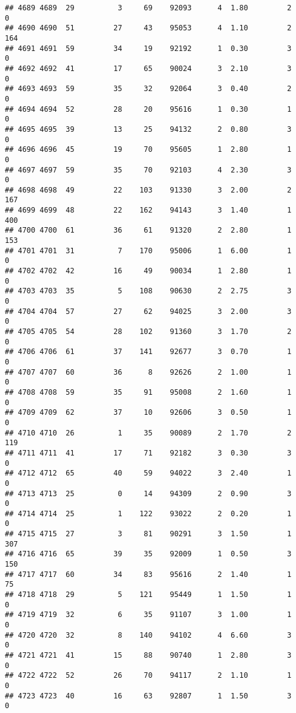 \documentclass[
]{article}
\begin{document}
\begin{verbatim}
## 4689 4689  29          3     69    92093      4  1.80         2        0
## 4690 4690  51         27     43    95053      4  1.10         2      164
## 4691 4691  59         34     19    92192      1  0.30         3        0
## 4692 4692  41         17     65    90024      3  2.10         3        0
## 4693 4693  59         35     32    92064      3  0.40         2        0
## 4694 4694  52         28     20    95616      1  0.30         1        0
## 4695 4695  39         13     25    94132      2  0.80         3        0
## 4696 4696  45         19     70    95605      1  2.80         1        0
## 4697 4697  59         35     70    92103      4  2.30         3        0
## 4698 4698  49         22    103    91330      3  2.00         2      167
## 4699 4699  48         22    162    94143      3  1.40         1      400
## 4700 4700  61         36     61    91320      2  2.80         1      153
## 4701 4701  31          7    170    95006      1  6.00         1        0
## 4702 4702  42         16     49    90034      1  2.80         1        0
## 4703 4703  35          5    108    90630      2  2.75         3        0
## 4704 4704  57         27     62    94025      3  2.00         3        0
## 4705 4705  54         28    102    91360      3  1.70         2        0
## 4706 4706  61         37    141    92677      3  0.70         1        0
## 4707 4707  60         36      8    92626      2  1.00         1        0
## 4708 4708  59         35     91    95008      2  1.60         1        0
## 4709 4709  62         37     10    92606      3  0.50         1        0
## 4710 4710  26          1     35    90089      2  1.70         2      119
## 4711 4711  41         17     71    92182      3  0.30         3        0
## 4712 4712  65         40     59    94022      3  2.40         1        0
## 4713 4713  25          0     14    94309      2  0.90         3        0
## 4714 4714  25          1    122    93022      2  0.20         1        0
## 4715 4715  27          3     81    90291      3  1.50         1      307
## 4716 4716  65         39     35    92009      1  0.50         3      150
## 4717 4717  60         34     83    95616      2  1.40         1       75
## 4718 4718  29          5    121    95449      1  1.50         1        0
## 4719 4719  32          6     35    91107      3  1.00         1        0
## 4720 4720  32          8    140    94102      4  6.60         3        0
## 4721 4721  41         15     88    90740      1  2.80         3        0
## 4722 4722  52         26     70    94117      2  1.10         1        0
## 4723 4723  40         16     63    92807      1  1.50         3        0

\end{verbatim}
\end{document}

